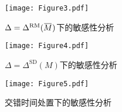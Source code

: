 \documentclass[cn,sakura,14pt,screen,bibstyle=gb7714-2015,math=mtpro2]{elegantnote}
\newcommand{\overbar}[1]{\mkern 1.5mu\overline{\mkern-1.5mu#1\mkern-1.5mu}\mkern 1.5mu}
\begin{document}
\begin{figure}
  \centering
  \texttt{[image: Figure3.pdf]}
  \caption{$\Delta=\Delta^\text{RM}(\overbar{M})$下的敏感性分析}\label{figure3}
\end{figure}


\begin{figure}
  \centering
  \texttt{[image: Figure4.pdf]}
  \caption{$\Delta=\Delta^\text{SD}(M)$下的敏感性分析}\label{figure4}
\end{figure}

\begin{figure}
  \centering
  \texttt{[image: Figure5.pdf]}
  \caption{交错时间处置下的敏感性分析}\label{figure5}
\end{figure}
\newpage

\nocite{Andrews2023inference}
\nocite{baker2022much}
\nocite{callaway2021difference}
\nocite{goodman2021difference}
\nocite{rambachan2023more}
\nocite{roth2022pretest}
\nocite{roth2023s}
\nocite{sun2021estimating}
\nocite{Zhang2023}
\printbibliography[heading=bibintoc, title=\ebibname]
\end{document}
